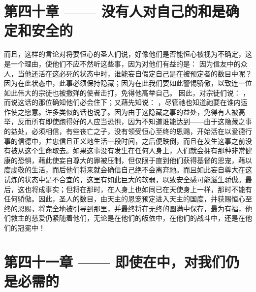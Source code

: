 
\section{第四十章 —— 没有人对自己的和是确定和安全的}

而且，这样的言论对将要恒心的圣人们说，好像他们是否能恒心被视为不确定，这是一个理由，使他们不应不然听这些事，因为对他们有益的是：  因为信友中的众人，当他还活在这必死的状态中时，谁能妄自假定自己是在被预定者的数目中呢？因为在此状态中，此事必须保持隐藏；因为在此我们要如此警惕骄傲，以致连一位如此伟大的宗徒也被撒殚的使者击打，免得他高举自己。  因此，对宗徒们说： ，而说这话的那位确知他们必会住下；又藉先知说： ，尽管祂也知道祂要在谁内运作使之愿意。许多类似的话也说了。因为由于这隐藏之事的益处，免得有人被高举，反而所有即使跑得好的人应当恐惧，因为不知道谁能达到——由于这隐藏之事的益处，必须相信，有些丧亡之子，没有领受恒心至终的恩赐，开始活在以爱德行事的信德中，并忠信且正义地生活一段时间，之后便跌倒，而且在发生这事之前没有被从这个生命取去。如果这事没有发生在任何人身上，人们就会拥有那种非常健康的恐惧，藉此使妄自尊大的罪被压制，但仅限于直到他们获得基督的恩宠，藉以度虔敬的生活，而后他们将来就会确信自己绝不会离弃祂。而且如此妄自尊大在这试炼的状态中是不合宜的，这里有如此巨大的软弱，以致安全感可能滋生骄傲。最后，这也将成事实；但将在那时，在人身上也如同已在天使身上一样，那时不能有任何骄傲。因此，圣人的数目，由天主的恩宠预定进入天主的国度，并获赐恒心至终的恩赐，将完全地被引导到那里，并最终将在无终的圆满中保存，最为有福，他们救主的慈爱仍紧随着他们，无论是在他们的皈依中，在他们的战斗中，还是在他们的冠冕中！\par


\section{第四十一章 —— 即使在中，对我们仍是必需的}

